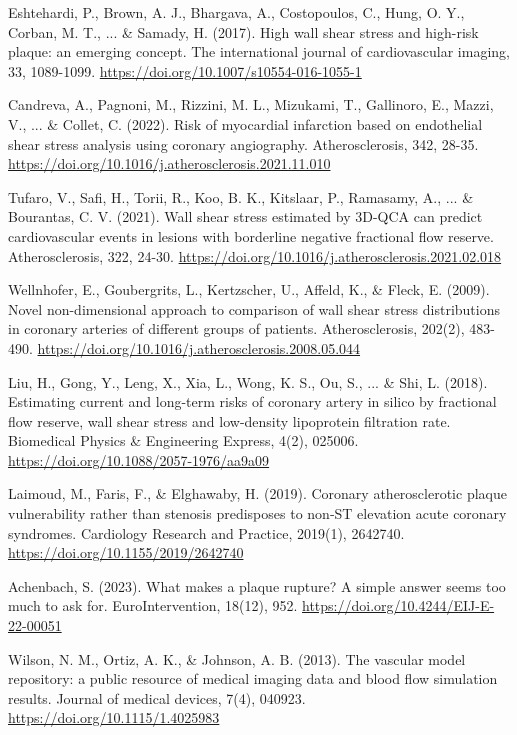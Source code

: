 ﻿\documentclass[12pt,a4paper]{article}
\theoremstyle{definition}
\numberwithin{equation}{section}
\begin{document}
\begin{thebibliography}{}
 Eshtehardi, P., Brown, A. J., Bhargava, A., Costopoulos, C., Hung, O. Y., Corban, M. T., ... \& Samady, H. (2017). High wall shear stress and high-risk plaque: an emerging concept. The international journal of cardiovascular imaging, 33, 1089-1099. \url{https://doi.org/10.1007/s10554-016-1055-1}

 Candreva, A., Pagnoni, M., Rizzini, M. L., Mizukami, T., Gallinoro, E., Mazzi, V., ... \& Collet, C. (2022). Risk of myocardial infarction based on endothelial shear stress analysis using coronary angiography. Atherosclerosis, 342, 28-35. \url{https://doi.org/10.1016/j.atherosclerosis.2021.11.010}

 Tufaro, V., Safi, H., Torii, R., Koo, B. K., Kitslaar, P., Ramasamy, A., ... \& Bourantas, C. V. (2021). Wall shear stress estimated by 3D-QCA can predict cardiovascular events in lesions with borderline negative fractional flow reserve. Atherosclerosis, 322, 24-30. \url{https://doi.org/10.1016/j.atherosclerosis.2021.02.018}

 Wellnhofer, E., Goubergrits, L., Kertzscher, U., Affeld, K., \& Fleck, E. (2009). Novel non-dimensional approach to comparison of wall shear stress distributions in coronary arteries of different groups of patients. Atherosclerosis, 202(2), 483-490. \url{https://doi.org/10.1016/j.atherosclerosis.2008.05.044}

 Liu, H., Gong, Y., Leng, X., Xia, L., Wong, K. S., Ou, S., ... \& Shi, L. (2018). Estimating current and long-term risks of coronary artery in silico by fractional flow reserve, wall shear stress and low-density lipoprotein filtration rate. Biomedical Physics \& Engineering Express, 4(2), 025006. \url{https://doi.org/10.1088/2057-1976/aa9a09}

 Laimoud, M., Faris, F., \& Elghawaby, H. (2019). Coronary atherosclerotic plaque vulnerability rather than stenosis predisposes to non‐ST elevation acute coronary syndromes. Cardiology Research and Practice, 2019(1), 2642740. \url{https://doi.org/10.1155/2019/2642740}

 Achenbach, S. (2023). What makes a plaque rupture? A simple answer seems too much to ask for. EuroIntervention, 18(12), 952. \url{https://doi.org/10.4244/EIJ-E-22-00051}

 Wilson, N. M., Ortiz, A. K., \& Johnson, A. B. (2013). The vascular model repository: a public resource of medical imaging data and blood flow simulation results. Journal of medical devices, 7(4), 040923. \url{https://doi.org/10.1115/1.4025983}


\end{thebibliography}
\end{document}

